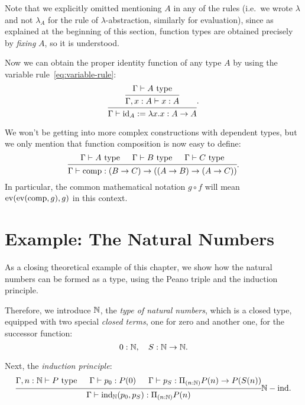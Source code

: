 Note that we explicitly omitted mentioning $ A $ in any of the rules
(i.e.\ we wrote $ \lambda $ and not $ \lambda_A $ for the rule of 
$ \lambda $-abstraction, similarly for evaluation), since as explained
at the beginning of this section, function types are obtained precisely
by \emph{fixing} $ A $, so it is understood.

Now we can obtain the proper identity function of any type $ A $ by using
the variable rule~\eqref{eq:variable-rule}:
\[
  \begin{prooftree}
    \hypo{\Gamma \vdash A \text{ type}}
    \infer1{\Gamma, x : A \vdash x : A}
    \infer1{\Gamma \vdash \dr{id}_A := \lambda x . x : A \to A}
  \end{prooftree}.
\]

We won't be getting into more complex constructions with dependent types,
but we only mention that function composition is now easy to define:
\[
  \begin{prooftree}
    \hypo{\Gamma \vdash A \text{ type}}
    \hypo{\Gamma \vdash B \text{ type}}
    \hypo{\Gamma \vdash C \text{ type}}
    \infer3{\Gamma \vdash \dr{comp} : (B \to C) \to ((A \to B) \to (A \to C))}
  \end{prooftree}.
\]
In particular, the common mathematical notation $ g \circ f $ will
mean $ \mathrm{ev}(\mathrm{ev}(\mathrm{comp},g),g) $ in this context.

\section{Example: The Natural Numbers}

As a closing theoretical example of this chapter, we show how the natural
numbers can be formed as a type, using the Peano triple and the induction
principle.

Therefore, we introduce $ \mathbb{N} $, the \emph{type of natural numbers}, which
is a closed type, equipped with two special \emph{closed terms}, one for
zero and another one, for the successor function:
\[
  0 : \mathbb{N}, \quad S : \mathbb{N} \to \mathbb{N}.
\]

Next, the \emph{induction principle}:
\[
  \begin{prooftree}
    \hypo{\Gamma, n : \NN \vdash P \text{ type}}
    \hypo{\Gamma \vdash p_0 : P(0)}
    \hypo{\Gamma \vdash p_S : \Pi_{(n : \NN)} P(n) \to P(S(n))}
    \infer3{\Gamma \vdash \dr{ind}_{\NN} (p_0, p_S) : \Pi_{(n : \NN)} P(n)}.
  \end{prooftree}\NN-\text{ind}.
\]

